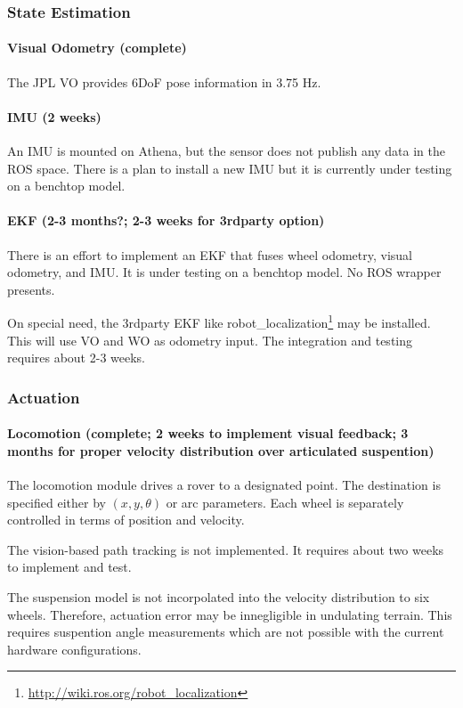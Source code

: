 \documentclass[conference]{IEEEtran}
\begin{document}
\subsubsection{State Estimation}

\paragraph{Visual Odometry (complete)}
The JPL VO provides 6DoF pose information in 3.75 Hz. 

\paragraph{IMU (2 weeks)}
An IMU is mounted on Athena, but the sensor does not publish any data in the ROS space. There is a plan to install a new IMU but it is currently under testing on a benchtop model.

\paragraph{EKF (2-3 months?; 2-3 weeks for 3rdparty option)}
There is an effort to implement an EKF that fuses wheel odometry, visual odometry, and IMU. It is under testing on a benchtop model. No ROS wrapper presents.

On special need,  the 3rdparty EKF like robot\_localization\footnote{\url{http://wiki.ros.org/robot_localization}} may be installed. This will use VO and WO as odometry input. The integration and testing requires about 2-3 weeks.


\subsubsection{Actuation}

\paragraph{Locomotion (complete; 2 weeks to implement visual feedback; 3 months for proper velocity distribution over articulated suspention)}
The locomotion module drives a rover to a designated point. The destination is specified either by $ (x, y, \theta) $ or arc parameters. Each wheel is separately controlled in terms of position and velocity.

The vision-based path tracking is not implemented. It requires about two weeks to implement and test. 

The suspension model is not incorpolated into the velocity distribution to six wheels. Therefore, actuation error may be innegligible in undulating terrain. This requires suspention angle measurements which are not possible with the current hardware configurations. 
\end{document}
